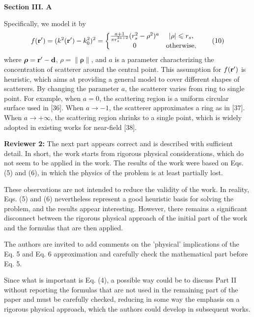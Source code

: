 \documentclass[a4paper,12pt]{article}
\begin{document}
\begin{framed}
	{\bf Section III. A}

    Specifically, we model it by 
	\begin{equation}
		f({\bf r}') = (k^2({\bf r}')-k_0^2)^2  =\left\{\begin{matrix}
		\frac{a+1}{\pi r_s^{2a+2}} (r_s^2-\rho^2)^{a}	&\left| \rho \right|\leqslant r_s, \\ 
		0	& {\rm otherwise},
		\end{matrix}\right.
		\tag{10}
	\end{equation}
where $\boldsymbol{\rho} = {\bf r}' - {\bf d}$, $\rho = \|\boldsymbol{\rho}\|$, and $a$ is a parameter characterizing the concentration of scatterer around the central point. {\color{red} This assumption for $f({\bf r}')$ is heuristic, which aims at providing a general model to cover different shapes of scatterers. By changing the parameter $a$, the scatterer varies from ring to single point.
For example, when $a = 0$, the scattering region is a uniform circular surface used in [36]. When $a \rightarrow -1$, the scatterer approximates a ring as in [37]. When $a \rightarrow +\infty$, the scattering region shrinks to a single point, which is widely adopted in existing works for near-field [38].}
\end{framed}

\textbf{Reviewer 2:}
The next part appears correct and is described with sufficient detail.
In short, the work starts from rigorous physical considerations, which do not seem to be applied in the work. The results of the work were based on Eqs. (5) and (6), in which the physics of the problem is at least partially lost.

These observations are not intended to reduce the validity of the work. In reality, Eqs. (5) and (6) nevertheless represent a good heuristic basis for solving the problem, and the results appear interesting. However, there remains a significant disconnect between the rigorous physical approach of the initial part of the work and the formulas that are then applied.

The authors are invited to add comments on the 'physical' implications of the Eq. 5 and Eq. 6  approximation and carefully check the mathematical part before Eq. 5.

Since what is important is Eq. (4), a possible way could be to discuss Part II without reporting the formulas that are not used in the remaining part of the paper and must be carefully checked, reducing in some way the emphasis on a rigorous physical approach, which the authors could develop in subsequent works.
\end{document}

